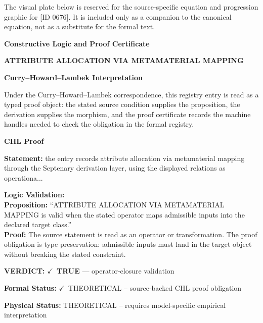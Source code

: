 \begingroup\footnotesize\sloppy
The visual plate below is reserved for the source-specific equation and progression graphic for [ID 0676]. It is included only as a companion to the canonical equation, not as a substitute for the formal text.
\par\endgroup
\ifTZPDarkEdition
{}
\fi

\clearpage
\begingroup\tzpsupportsetup
\noindent\textbf{\fontsize{10.8pt}{12.8pt}\selectfont [ID 0676] Constructive Logic and Proof Certificate}\par
\noindent\textbf{\fontsize{10pt}{12pt}\selectfont ATTRIBUTE ALLOCATION VIA METAMATERIAL MAPPING}\par
\vspace{0.45em}
\begingroup
\footnotesize
\setlength{\parskip}{0.22em}
\setlength{\parindent}{0pt}
\noindent\textbf{Curry--Howard--Lambek Interpretation}\par
Under the Curry--Howard--Lambek correspondence, this registry entry is read as a typed proof
object: the stated source condition supplies the proposition, the derivation supplies the
morphism, and the proof certificate records the machine handles needed to check the obligation
in the formal registry.

\vspace{0.45em}
\noindent\textbf{CHL Proof}\par
\textbf{Statement:} the entry records attribute allocation via metamaterial mapping through the Septenary
derivation layer, using the displayed relations as operationa...

\textbf{Logic Validation:}\\
\textbf{Proposition:} ``ATTRIBUTE ALLOCATION VIA METAMATERIAL MAPPING is valid when the stated operator maps
admissible inputs into the declared target class.''\\
\textbf{Proof:} The source statement is read as an operator or transformation. The proof obligation is
type preservation: admissible inputs must land in the target object without breaking the
stated constraint.

\textbf{VERDICT:} \ensuremath{\checkmark}\ \textbf{TRUE} --- operator-closure validation

\textbf{Formal Status:} \ensuremath{\checkmark}\ THEORETICAL -- source-backed CHL proof obligation

\textbf{Physical Status:} THEORETICAL -- requires model-specific empirical interpretation
\par\vspace{0.45em}
\par
\ifTZPDarkEdition
{}
\fi
\endgroup
\endgroup
